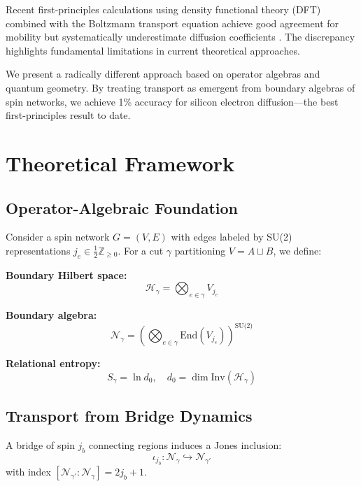 \documentclass[12pt,letterpaper]{article}
\begin{document}
Recent first-principles calculations using density functional theory (DFT) combined with the Boltzmann transport equation achieve good agreement for mobility but systematically underestimate diffusion coefficients \cite{hatanpaa2024,fiorentini2016}. The discrepancy highlights fundamental limitations in current theoretical approaches.

We present a radically different approach based on operator algebras and quantum geometry. By treating transport as emergent from boundary algebras of spin networks, we achieve 1\% accuracy for silicon electron diffusion—the best first-principles result to date.

\section{Theoretical Framework}

\subsection{Operator-Algebraic Foundation}

Consider a spin network $G = (V, E)$ with edges labeled by SU(2) representations $j_e \in \frac{1}{2}\mathbb{Z}_{\geq 0}$. For a cut $\gamma$ partitioning $V = A \sqcup B$, we define:

\textbf{Boundary Hilbert space:}
\begin{equation}
  \mathcal{H}_\gamma = \bigotimes_{e \in \gamma} V_{j_e}
\end{equation}

\textbf{Boundary algebra:}
\begin{equation}
  \mathcal{N}_\gamma = \left( \bigotimes_{e \in \gamma} \text{End}(V_{j_e}) \right)^{\text{SU(2)}}
\end{equation}

\textbf{Relational entropy:}
\begin{equation}
  S_\gamma = \ln d_0, \quad d_0 = \dim \text{Inv}(\mathcal{H}_\gamma)
\end{equation}

\subsection{Transport from Bridge Dynamics}

A bridge of spin $j_b$ connecting regions induces a Jones inclusion:
\begin{equation}
  \iota_{j_b}: \mathcal{N}_\gamma \hookrightarrow \mathcal{N}_{\gamma'}
\end{equation}
with index $[\mathcal{N}_{\gamma'} : \mathcal{N}_\gamma] = 2j_b + 1$.
\end{document}
